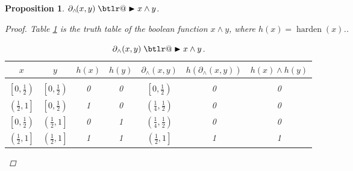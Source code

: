 \documentclass{article} %
\makeatletter
\newtheorem{prop}{Proposition}
\DeclareRobustCommand{\btright}{\mathrel{\mathpalette\btlr@\blacktriangleright}}
\newcommand{\btlr@}[2]{%
	\begingroup
	\sbox\z@{$\m@th#1\triangleright$}%
	\sbox\tw@{\resizebox{1.1\wd\z@}{1.1\ht\z@}{\raisebox{\depth}{$\m@th#1\mkern-1mu#2$}}}%
	\ht\tw@=\ht\z@ \dp\tw@=\dp\z@ \wd\tw@=\wd\z@
	\copy\tw@
	\endgroup
}
\makeatother
\begin{document}
\begin{prop}\label{prop:and}
	$\partial_{\wedge}\!(x,y) \btright x \wedge y$.
\begin{proof}
	Table \ref{and-table} is the truth table of the boolean function $x \wedge y$, where $h(x) = \operatorname{harden}(x)$..
	\begin{table}[h!]
		\begin{center}
			\begin{tabular}{ccccccc}
				\multicolumn{1}{c}{$x$}  &\multicolumn{1}{c}{$y$}  &\multicolumn{1}{c}{$h(x)$}  &\multicolumn{1}{c}{$h(y)$} &\multicolumn{1}{c}{$\partial_{\wedge}(x, y)$} &\multicolumn{1}{c}{$h(\partial_{\wedge}(x, y))$}
				&\multicolumn{1}{c}{$h(x) \wedge h(y)$}
				\\ \hline \\
				$\left[0, \frac{1}{2}\right)$ & $\left[0, \frac{1}{2}\right)$ & 0 & 0 & $\left[0, \frac{1}{2}\right)$ & 0 & 0\\[0.1cm]
				$\left(\frac{1}{2}, 1\right]$ & $\left[0, \frac{1}{2}\right)$ &1 & 0 & $\left(\frac{1}{4}, \frac{1}{2}\right)$ & 0 & 0\\[0.1cm]
				$\left[0, \frac{1}{2}\right)$ & $\left(\frac{1}{2}, 1\right]$ &0 & 1 & $\left(\frac{1}{4}, \frac{1}{2}\right)$ & 0 & 0\\[0.1cm]
				$\left(\frac{1}{2}, 1\right]$ & $\left(\frac{1}{2}, 1\right]$ &1 & 1 & $\left(\frac{1}{2}, 1\right]$ & 1 & 1\\[0.1cm]
			\end{tabular}
		\end{center}
		\caption{$\partial_{\wedge}(x,y) \btright x \wedge y$.}\label{and-table}
	\end{table}			
\end{proof}
\end{prop}
\end{document}
